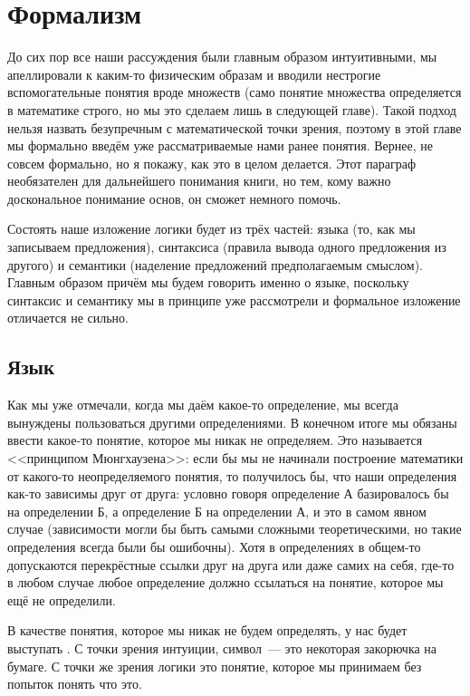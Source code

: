 \section{Формализм}

До сих пор все наши рассуждения были главным образом интуитивными, мы апеллировали к каким-то физическим образам и вводили нестрогие вспомогательные понятия вроде множеств (само понятие множества определяется в математике строго, но мы это сделаем лишь в следующей главе). Такой подход нельзя назвать безупречным с математической точки зрения, поэтому в этой главе мы формально введём уже рассматриваемые нами ранее понятия.  Вернее, не совсем формально, но я покажу, как это в целом делается. Этот параграф необязателен для дальнейшего понимания книги, но тем, кому важно доскональное понимание основ, он сможет немного помочь.

Состоять наше изложение логики будет из трёх частей: языка (то, как мы записываем предложения), синтаксиса (правила вывода одного предложения из другого) и семантики (наделение предложений предполагаемым смыслом). Главным образом причём мы будем говорить именно о языке, поскольку синтаксис и семантику мы в принципе уже рассмотрели и формальное изложение отличается не сильно.

\subsection{Язык}

Как мы уже отмечали, когда мы даём какое-то определение, мы всегда вынуждены пользоваться другими определениями. В конечном итоге мы обязаны ввести какое-то понятие, которое мы никак не определяем. Это называется <<принципом Мюнгхаузена>>: если бы мы не начинали построение математики от какого-то неопределяемого понятия, то получилось бы, что наши определения как-то зависимы друг от друга: условно говоря определение А базировалось бы на определении Б, а определение Б на определении А, и это в самом явном случае (зависимости могли бы быть самыми сложными теоретическими, но такие определения всегда были бы ошибочны). Хотя в определениях в общем-то допускаются перекрёстные ссылки друг на друга или даже самих на себя, где-то в любом случае любое определение должно ссылаться на понятие, которое мы ещё не определили.

В качестве понятия, которое мы никак не будем определять, у нас будет выступать . С точки зрения интуиции, символ~--- это некоторая закорючка на бумаге. С точки же зрения логики это понятие, которое мы принимаем без попыток понять что это.

